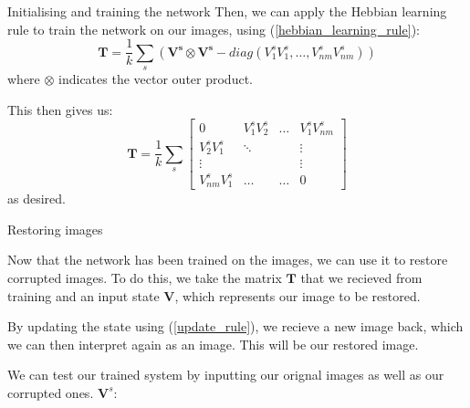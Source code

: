 \documentclass[25pt, a0paper, portrait]{beamer}
\newlength{\colwidth}
\begin{document}
\begin{frame}[t]
\begin{columns}[t]
\begin{column}{\colwidth}
\begin{block}{Initialising and training the network}
    Then, we can apply the Hebbian learning rule to train the network on our images, using
    (\ref{hebbian_learning_rule}):
    \begin{equation} \label{hebbian_simple_eq}
      \boldsymbol{T} = \frac{1}{k} \sum_{s}(\boldsymbol{V^s}\otimes\boldsymbol{V^s} - diag({V^s_1}{V^s_1}, \dots, {V^s_{nm}}{V^s_{nm}}))
    \end{equation}
    where $\otimes$ indicates the vector outer product.

    This then gives us:
    \begin{equation*}
      \boldsymbol{T} = \frac{1}{k} \sum_{s} \begin{bmatrix}
        0                 & {V^s_1}{V^s_2}  & \dots   & {V^s_1}{V^s_{nm}}\\
        {V^s_2}{V^s_1}    & \ddots          &         & \vdots \\
        \vdots            &                 &         & \vdots \\
        {V^s_{nm}}{V^s_1} & \dots           & \dots   & 0
      \end{bmatrix}
    \end{equation*}
    as desired.

  \end{block}

  \begin{block}{Restoring images} \small

    Now that the network has been trained on the images, we can use it to restore
    corrupted images. To do this, we take the matrix $\boldsymbol{T}$ that we
    recieved from training and an input state $\boldsymbol{V}$, which represents
    our image to be restored.

    By updating the state using (\ref{update_rule}), we recieve a new image back,
    which we can then interpret again as an image. This will be our restored image.

    We can test our trained system by inputting our orignal images as well as our
    corrupted ones. $\boldsymbol{V}^s$:
    

\end{block}
\end{column}
\end{columns}
\end{frame}
\end{document}
